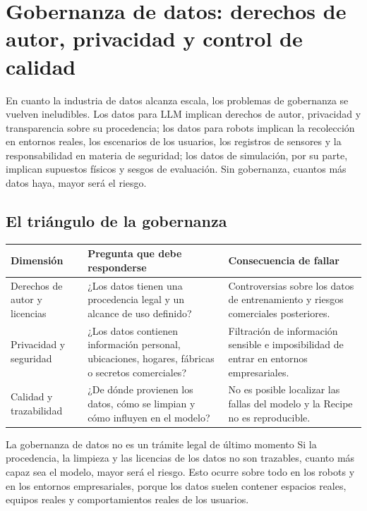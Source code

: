\section{Gobernanza de datos: derechos de autor, privacidad y control de calidad}

En cuanto la industria de datos alcanza escala, los problemas de gobernanza se vuelven ineludibles. Los datos para LLM implican derechos de autor, privacidad y transparencia sobre su procedencia; los datos para robots implican la recolección en entornos reales, los escenarios de los usuarios, los registros de sensores y la responsabilidad en materia de seguridad; los datos de simulación, por su parte, implican supuestos físicos y sesgos de evaluación. Sin gobernanza, cuantos más datos haya, mayor será el riesgo.

\subsection{El triángulo de la gobernanza}

\noindent\begin{longtable}{p{}p{}p{}}
\toprule
Dimensión & Pregunta que debe responderse & Consecuencia de fallar \\
\midrule
Derechos de autor y licencias & ¿Los datos tienen una procedencia legal y un alcance de uso definido? & Controversias sobre los datos de entrenamiento y riesgos comerciales posteriores. \\
Privacidad y seguridad & ¿Los datos contienen información personal, ubicaciones, hogares, fábricas o secretos comerciales? & Filtración de información sensible e imposibilidad de entrar en entornos empresariales. \\
Calidad y trazabilidad & ¿De dónde provienen los datos, cómo se limpian y cómo influyen en el modelo? & No es posible localizar las fallas del modelo y la Recipe no es reproducible. \\
\bottomrule
\end{longtable}

\begin{warningbox}{La gobernanza de datos no es un trámite legal de último momento}
Si la procedencia, la limpieza y las licencias de los datos no son trazables, cuanto más capaz sea el modelo, mayor será el riesgo. Esto ocurre sobre todo en los robots y en los entornos empresariales, porque los datos suelen contener espacios reales, equipos reales y comportamientos reales de los usuarios.
\end{warningbox}

